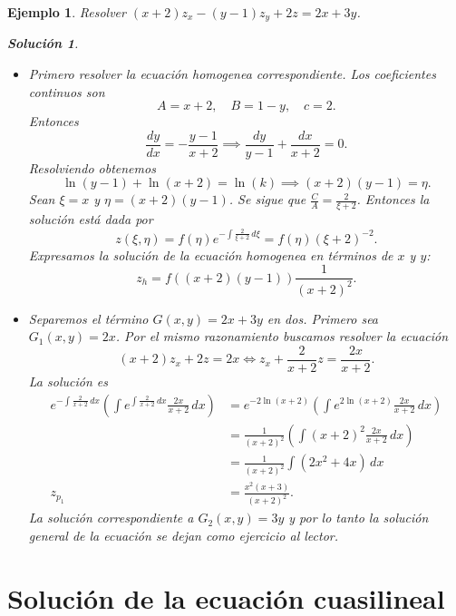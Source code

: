 \documentclass[11pt,letterpaper]{report}
\newtheorem{example}[defn]{Ejemplo}
\newtheorem*{sol}{Solución}
\newcommand\<{\langle}
\renewcommand\>{\rangle}
\begin{document}
\begin{example}
  Resolver $(x+2)z_x - (y-1)z_y + 2z = 2x + 3y$.
  \begin{sol}
    \begin{itemize}
      \item Primero resolver la ecuación homogenea
        correspondiente. Los coeficientes continuos son
        \[
        A = x + 2, \quad B = 1 - y, \quad c = 2.
        \] 
        Entonces
        \[
        \frac{dy}{dx} = -\frac{y-1}{x+2} \implies
        \frac{dy}{y-1} + \frac{dx}{x+2} = 0.
        \] 
        Resolviendo obtenemos
        \[
        \ln(y-1) + \ln(x+2) = \ln(k) \implies (x+2)(y-1) =
        \eta.
        \] 
        Sean $\xi = x$ y $\eta = (x+2)(y-1)$. Se sigue que
        $\frac{C}{A} = \frac{2}{\xi + 2}$. Entonces la
        solución está dada por
        \[
        z(\xi,\eta) = f(\eta)e^{-\int \frac{2}{\xi+2} \,
        d\xi} = f(\eta)(\xi+2)^{-2}.
        \] 
        Expresamos la solución de la ecuación homogenea en
        términos de $x$ y $y$:
        \[
        z_h = f((x+2)(y-1)) \frac{1}{(x+2)^2}.
        \] 
      \item Separemos el término $G(x,y) = 2x + 3y$ en dos.
        Primero sea $G_1(x,y) = 2x$. Por el mismo
        razonamiento buscamos resolver la ecuación 
        \[
          (x+2)z_x + 2z = 2x \iff z_x + \frac{2}{x+2}z =
          \frac{2x}{x+2}.
        \] 
        La solución es
        \begin{align*}
          e^{-\int \frac{2}{x+2} \, dx} \left(\int e^{\int
            \frac{2}{x+2} \, dx} \frac{2x}{x+2} \, dx\right)
            &=
            e^{-2\ln(x+2)}\left(\int e^{2\ln(x+2)}
            \frac{2x}{x+2} \, dx\right)\\
            &=
            \frac{1}{(x+2)^2}\left(\int (x+2)^2
            \frac{2x}{x+2} \, dx\right)\\
            &= \frac{1}{(x+2)^2} \int
            \left(2x^2 + 4x\right) \, dx\\
            z_{p_1} &= \frac{x^2(x+3)}{(x+2)^2}.
        \end{align*}
        La solución correspondiente a $G_2(x,y) = 3y$ y por
        lo tanto la solución general de la ecuación se dejan
        como ejercicio al lector.
    \end{itemize}
  \end{sol}
\end{example}

\section{Solución de la ecuación cuasilineal}
\end{document}
